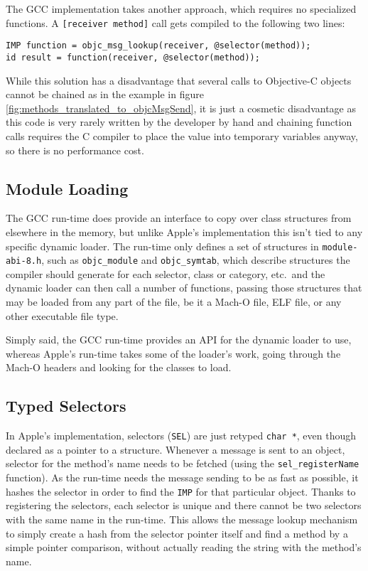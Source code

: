 The GCC implementation takes another approach, which requires no specialized functions. A \verb=[receiver method]= call gets compiled to the following two lines:

\begin{verbatim}
IMP function = objc_msg_lookup(receiver, @selector(method));
id result = function(receiver, @selector(method));
\end{verbatim}

While this solution has a disadvantage that several calls to Objective-C objects cannot be chained as in the example in figure \ref{fig:methods_translated_to_objcMsgSend}, it is just a cosmetic disadvantage as this code is very rarely written by the developer by hand and chaining function calls requires the C compiler to place the value into temporary variables anyway, so there is no performance cost.

\subsection{Module Loading}

The GCC run-time does provide an interface to copy over class structures from elsewhere in the memory, but unlike Apple's implementation this isn't tied to any specific dynamic loader. The run-time only defines a set of structures in \verb=module-abi-8.h=, such as \verb=objc_module= and \verb=objc_symtab=, which describe structures the compiler should generate for each selector, class or category, etc.\ and the dynamic loader can then call a number of functions, passing those structures that may be loaded from any part of the file, be it a Mach-O file, ELF file, or any other executable file type.

Simply said, the GCC run-time provides an API for the dynamic loader to use, whereas Apple's run-time takes some of the loader's work, going through the Mach-O headers and looking for the classes to load.

\subsection{Typed Selectors}

In Apple's implementation, selectors (\verb=SEL=) are just retyped \verb=char *=, even though declared as a pointer to a structure. Whenever a message is sent to an object, selector for the method's name needs to be fetched (using the \verb=sel_registerName= function). As the run-time needs the message sending to be as fast as possible, it hashes the selector in order to find the \verb=IMP= for that particular object. Thanks to registering the selectors, each selector is unique and there cannot be two selectors with the same name in the run-time. This allows the message lookup mechanism to simply create a hash from the selector pointer itself and find a method by a simple pointer comparison, without actually reading the string with the method's name.

